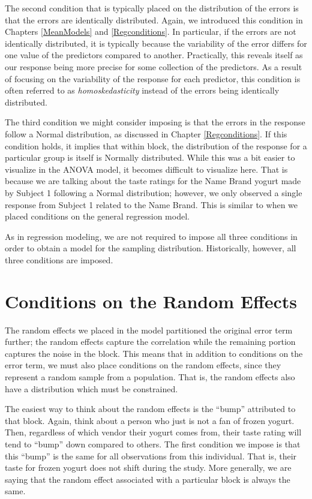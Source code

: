 \documentclass[
]{book}
\theoremstyle{plain}
\theoremstyle{mydefn}
\theoremstyle{myexmpl}
\theoremstyle{remark}
\begin{document}
The second condition that is typically placed on the distribution of the errors is that the errors are identically distributed. Again, we introduced this condition in Chapters \ref{MeanModels} and \ref{Regconditions}. In particular, if the errors are not identically distributed, it is typically because the variability of the error differs for one value of the predictors compared to another. Practically, this reveals itself as our response being more precise for some collection of the predictors. As a result of focusing on the variability of the response for each predictor, this condition is often referred to as \emph{homoskedasticity} instead of the errors being identically distributed.

The third condition we might consider imposing is that the errors in the response follow a Normal distribution, as discussed in Chapter \ref{Regconditions}. If this condition holds, it implies that within block, the distribution of the response for a particular group is itself is Normally distributed. While this was a bit easier to visualize in the ANOVA model, it becomes difficult to visualize here. That is because we are talking about the taste ratings for the Name Brand yogurt made by Subject 1 following a Normal distribution; however, we only observed a single response from Subject 1 related to the Name Brand. This is similar to when we placed conditions on the general regression model.

As in regression modeling, we are not required to impose all three conditions in order to obtain a model for the sampling distribution. Historically, however, all three conditions are imposed.

\hypertarget{conditions-on-the-random-effects}{%
\section{Conditions on the Random Effects}\label{conditions-on-the-random-effects}}

The random effects we placed in the model partitioned the original error term further; the random effects capture the correlation while the remaining portion captures the noise in the block. This means that in addition to conditions on the error term, we must also place conditions on the random effects, since they represent a random sample from a population. That is, the random effects also have a distribution which must be constrained.

The easiest way to think about the random effects is the ``bump'' attributed to that block. Again, think about a person who just is not a fan of frozen yogurt. Then, regardless of which vendor their yogurt comes from, their taste rating will tend to ``bump'' down compared to others. The first condition we impose is that this ``bump'' is the same for all observations from this individual. That is, their taste for frozen yogurt does not shift during the study. More generally, we are saying that the random effect associated with a particular block is always the same.
\end{document}
